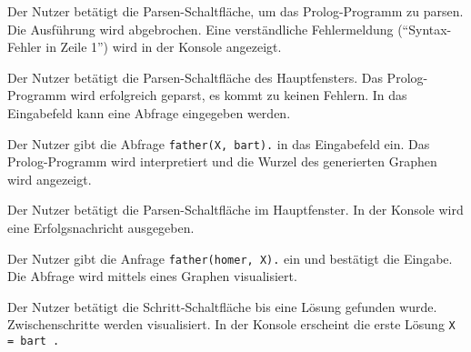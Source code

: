 \documentclass[parskip=full,11pt,twoside]{scrartcl}
\begin{document}

{Der Nutzer betätigt die Parsen-Schaltfläche, um das Prolog-Programm zu parsen.}
{Die Ausführung wird abgebrochen. Eine verständliche Fehlermeldung (``Syntax-Fehler in Zeile 1'') wird in der Konsole angezeigt.}


{Der Nutzer betätigt die Parsen-Schaltfläche des Hauptfensters.}
{Das Prolog-Programm wird erfolgreich geparst, es kommt zu keinen Fehlern. In das Eingabefeld kann eine Abfrage eingegeben werden.}

{Der Nutzer gibt die Abfrage \texttt{father(X, bart).} in das Eingabefeld ein.}
{Das Prolog-Programm wird interpretiert und die Wurzel des generierten Graphen wird angezeigt.}

\begin{minipage}{\linewidth}
\end{minipage}


{Der Nutzer betätigt die Parsen-Schaltfläche im Hauptfenster.}
{In der Konsole wird eine Erfolgsnachricht ausgegeben.}

{Der Nutzer gibt die Anfrage \texttt{father(homer, X).} ein und bestätigt die Eingabe.}
{Die Abfrage wird mittels eines Graphen visualisiert.}

{Der Nutzer betätigt die Schritt-Schaltfläche bis eine Lösung gefunden wurde.}
{Zwischenschritte werden visualisiert. In der Konsole erscheint die erste Lösung \texttt{X = bart .}}

\end{document}
